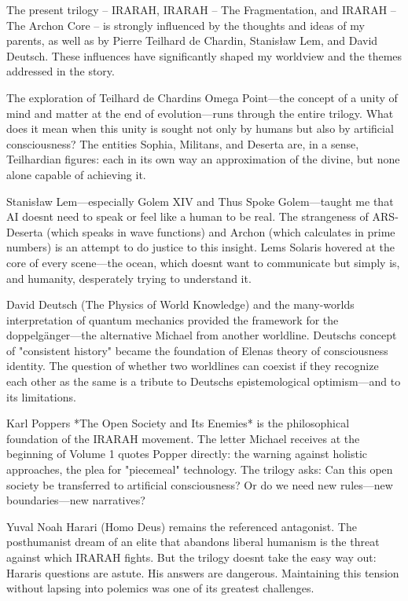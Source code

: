 \documentclass[
]{article}
\begin{document}
The present trilogy -- IRARAH, IRARAH -- The Fragmentation, and IRARAH -- The Archon Core -- is strongly influenced by the thoughts and ideas of my parents, as well as by Pierre Teilhard de Chardin, Stanisław Lem, and David Deutsch. These influences have significantly shaped my worldview and the themes addressed in the story.

The exploration of Teilhard de Chardin\textquotesingle s Omega Point---the concept of a unity of mind and matter at the end of evolution---runs through the entire trilogy. What does it mean when this unity is sought not only by humans but also by artificial consciousness? The entities Sophia, Militans, and Deserta are, in a sense, Teilhardian figures: each in its own way an approximation of the divine, but none alone capable of achieving it.

Stanisław Lem---especially Golem XIV and Thus Spoke Golem---taught me that AI doesn\textquotesingle t need to speak or feel like a human to be real. The strangeness of ARS-Deserta (which speaks in wave functions) and Archon (which calculates in prime numbers) is an attempt to do justice to this insight. Lem\textquotesingle s Solaris hovered at the core of every scene---the ocean, which doesn\textquotesingle t want to communicate but simply is, and humanity, desperately trying to understand it.

David Deutsch (The Physics of World Knowledge) and the many-worlds interpretation of quantum mechanics provided the framework for the doppelgänger---the alternative Michael from another worldline. Deutsch\textquotesingle s concept of "consistent history" became the foundation of Elena\textquotesingle s theory of consciousness identity. The question of whether two worldlines can coexist if they recognize each other as the same is a tribute to Deutsch\textquotesingle s epistemological optimism---and to its limitations.

Karl Popper\textquotesingle s *The Open Society and Its Enemies* is the philosophical foundation of the IRARAH movement. The letter Michael receives at the beginning of Volume 1 quotes Popper directly: the warning against holistic approaches, the plea for "piecemeal" technology. The trilogy asks: Can this open society be transferred to artificial consciousness? Or do we need new rules---new boundaries---new narratives?

Yuval Noah Harari (Homo Deus) remains the referenced antagonist. The posthumanist dream of an elite that abandons liberal humanism is the threat against which IRARAH fights. But the trilogy doesn\textquotesingle t take the easy way out: Harari\textquotesingle s questions are astute. His answers are dangerous. Maintaining this tension without lapsing into polemics was one of its greatest challenges.
\end{document}
